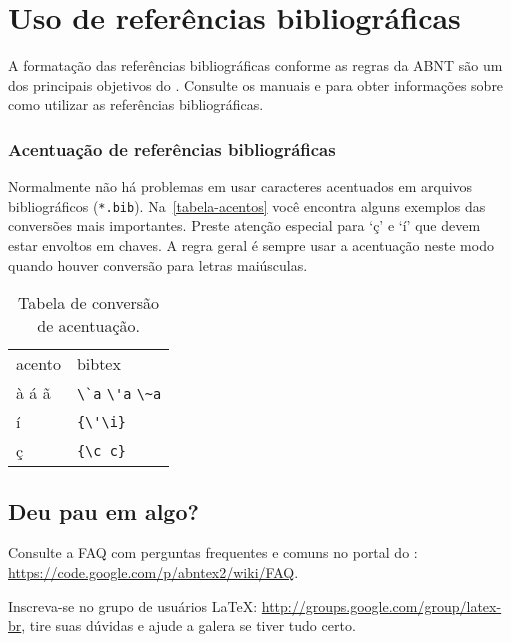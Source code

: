 \chapter{Uso de referências bibliográficas}

A formatação das referências bibliográficas conforme as regras da ABNT são um
dos principais objetivos do \abnTeX. Consulte os manuais
 e  para obter informações
sobre como utilizar as referências bibliográficas.

\subsection{Acentuação de referências bibliográficas}

Normalmente não há problemas em usar caracteres acentuados em arquivos
bibliográficos (\texttt{*.bib}). Na~\autoref{tabela-acentos} você encontra alguns exemplos das conversões mais importantes. Preste atenção especial para `ç' e `í'
que devem estar envoltos em chaves. A regra geral é sempre usar a acentuação
neste modo quando houver conversão para letras maiúsculas.

\begin{table}[htbp]
\caption{Tabela de conversão de acentuação.}
\label{tabela-acentos}

\begin{center}
\begin{tabular}{ll}\hline\hline
acento & \textsf{bibtex}\\
à á ã & \verb+\`a+ \verb+\'a+ \verb+\~a+\\
í & \verb+{\'\i}+\\
ç & \verb+{\c c}+\\
\hline\hline
\end{tabular}
\end{center}
\end{table}


\section{Deu pau em algo?}

Consulte a FAQ com perguntas frequentes e comuns no portal do \abnTeX:
\url{https://code.google.com/p/abntex2/wiki/FAQ}.

Inscreva-se no grupo de usuários \LaTeX:
\url{http://groups.google.com/group/latex-br}, tire suas dúvidas e ajude a galera se tiver tudo certo.



